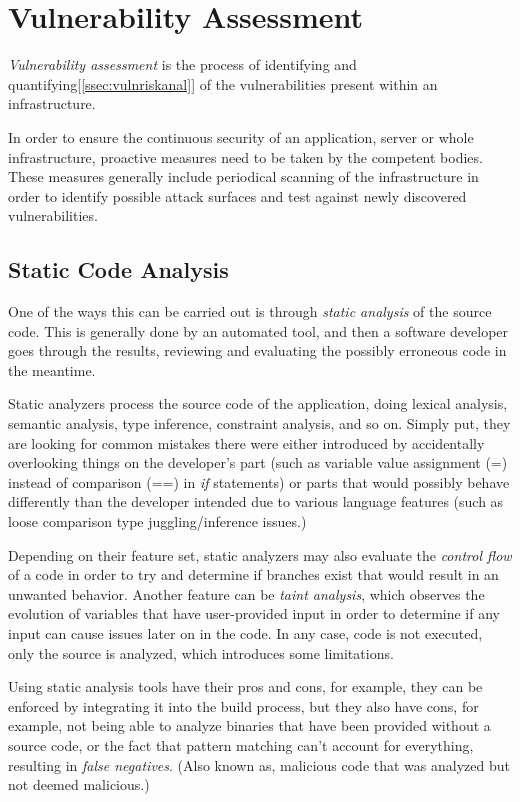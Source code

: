 \documentclass[a4paper,12pt]{article}
\begin{document}
\newpage
\section{Vulnerability Assessment}
	
	\textit{Vulnerability assessment} is the process of identifying and quantifying[\ref{ssec:vulnriskanal}] of the vulnerabilities present within an infrastructure.
	
	In order to ensure the continuous security of an application, server or whole infrastructure, proactive measures need to be taken by the competent bodies. These measures generally include periodical scanning of the infrastructure in order to identify possible attack surfaces and test against newly discovered vulnerabilities.
	
\subsection{Static Code Analysis}
	
	One of the ways this can be carried out is through \textit{static analysis} of the source code. This is generally done by an automated tool, and then a software developer goes through the results, reviewing and evaluating the possibly erroneous code in the meantime.
	
	Static analyzers process the source code of the application, doing lexical analysis, semantic analysis, type inference, constraint analysis, and so on. Simply put, they are looking for common mistakes there were either introduced by accidentally overlooking things on the developer's part (such as variable value assignment (=) instead of comparison (==) in \textit{if} statements) or parts that would possibly behave differently than the developer intended due to various language features (such as loose comparison type juggling/inference issues.)
	
	Depending on their feature set, static analyzers may also evaluate the \textit{control flow} of a code in order to try and determine if branches exist that would result in an unwanted behavior. Another feature can be \textit{taint analysis}, which observes the evolution of variables that have user-provided input in order to determine if any input can cause issues later on in the code. In any case, code is not executed, only the source is analyzed, which introduces some limitations.
	
	Using static analysis tools have their pros and cons, for example, they can be enforced by integrating it into the build process, but they also have cons, for example, not being able to analyze binaries that have been provided without a source code, or the fact that pattern matching can't account for everything, resulting in \textit{false negatives}. (Also known as, malicious code that was analyzed but not deemed malicious.)
	
\end{document}
